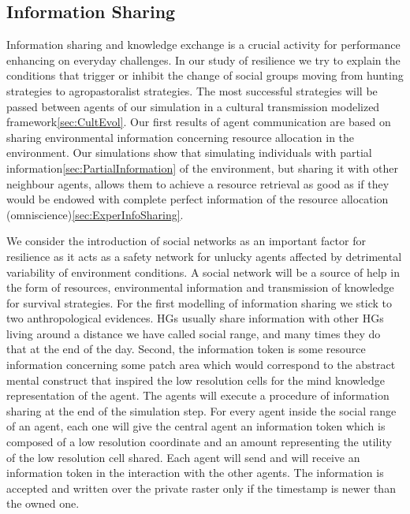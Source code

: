 \documentclass[11pt,oneside,a4paper,openright]{report}
\begin{document}
\subsection{Information Sharing}
\label{sec:InformationSharing}

Information sharing and knowledge exchange is a crucial activity for performance enhancing on everyday challenges. In our study of resilience we try to explain the conditions that trigger or inhibit the change of social groups moving from hunting strategies to agropastoralist strategies. The most successful strategies will be passed between agents of our simulation in a cultural transmission modelized framework\ref{sec:CultEvol}. Our first results of agent communication are based on sharing environmental information concerning resource allocation in the environment. Our simulations show that simulating individuals with partial information\ref{sec:PartialInformation} of the environment, but sharing it with other neighbour agents, allows them to achieve a resource retrieval as good as if they would be endowed with complete perfect information of the resource allocation (omniscience)\ref{sec:ExperInfoSharing}.

We consider the introduction of social networks as an important factor for resilience as it acts as a safety network for unlucky agents affected by detrimental variability of environment conditions.%
A social network will be a source of help in the form of resources, environmental information and transmission of knowledge for survival strategies. For the first modelling of information sharing we stick to two anthropological evidences. HGs usually share information with other HGs living around a distance we have called social range, and many times they do that at the end of the day. Second, the information token is some resource information concerning some patch area which would correspond to the abstract mental construct that inspired the low resolution cells for the mind knowledge representation of the agent. The agents will execute a procedure of information sharing at the end of the simulation step. For every agent inside the social range of an agent, each one will give the central agent an information token which is composed of a low resolution coordinate and an amount representing the utility of the low resolution cell shared. Each agent will send and will receive an information token in the interaction with the other agents. The information is accepted and written over the private raster only if the timestamp is newer than the owned one.
\end{document}
